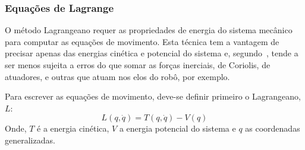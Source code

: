 




\subsubsection{Equações de Lagrange}

O método Lagrangeano requer as propriedades de energia do sistema mecânico para
computar as equações de movimento. Esta técnica tem a vantagem de precisar
apenas das energias cinética e potencial do sistema e,
segundo~\citet{murray1994mathematical}, tende a ser menos sujeita a erros do que
somar as forças inerciais, de Coriolis, de atuadores, e outras que atuam nos
elos do robô, por exemplo.

Para escrever as equações de movimento, deve-se definir primeiro o
Lagrangeano, $L$:
%
\begin{equation}
	L(q, \dot{q}) = T(q, \dot{q}) - V(q)
\end{equation}
%
Onde, $T$ é a energia cinética, $V$ a energia potencial do sistema e
$q$ as coordenadas generalizadas.

